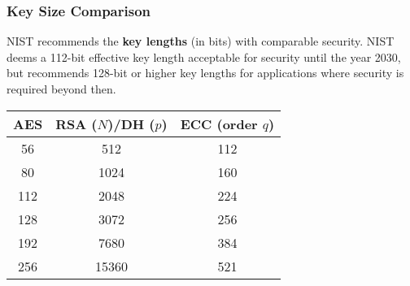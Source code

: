 \begin{frame}\frametitle{Key Size Comparison}
NIST recommends the \textbf{key lengths} (in bits) with comparable security. NIST deems a 112-bit effective key length acceptable for security until the year 2030, but recommends 128-bit or higher key lengths for applications where security is required beyond then.
\newline
\begin{center}
\begin{tabular}{|c|c|c|} \hline
AES & RSA ($N$)/DH ($p$) & ECC (order $q$) \\ \hline	
56 & 512 & 112 \\
80 & 1024 & 160 \\
112 & 2048 & 224 \\
128 & 3072 & 256 \\
192 & 7680 & 384 \\
256 & 15360 & 521 \\ \hline	
\end{tabular}	
\end{center}
\end{frame}

